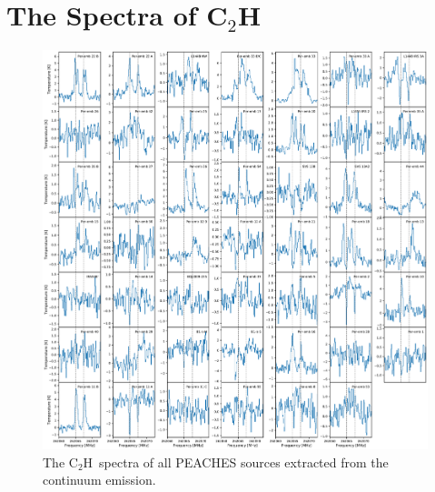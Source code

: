 \documentclass[twocolumn]{aastex62}
\newcommand{\methanol}{\mbox{CH$_{3}$OH}}
\newcommand{\cch}{\mbox{C$_2$H}}
\begin{document}
\section{The Spectra of \cch}


\begin{figure}[htbp!]
  \centering
  \includegraphics[width=\textwidth]{all_cch.pdf}
  \caption{The \cch\ spectra of all PEACHES sources extracted from the continuum emission.}
  \label{fig:all_cch}
\end{figure}
\end{document}
